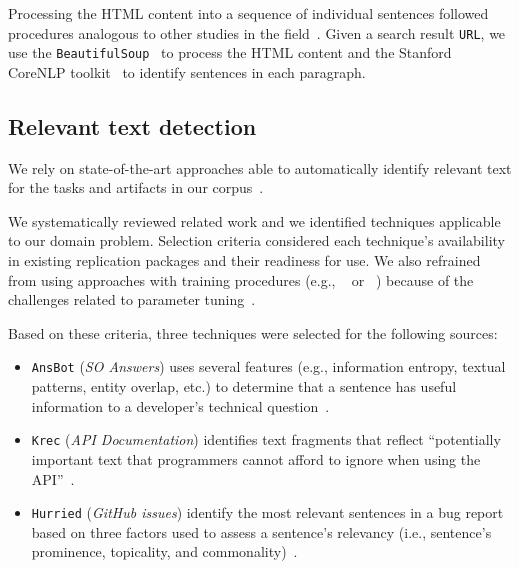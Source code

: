 Processing the HTML content into a sequence of individual sentences 
followed procedures analogous to other studies in the field~\cite{Arya2019, nadi2020}.
Given a search result \texttt{URL}, we use the \texttt{BeautifulSoup}~\cite{beautifulsoup4}
to process the HTML content and the Stanford CoreNLP toolkit~\cite{CoreNLP} to identify sentences in each paragraph.












\subsection{Relevant text detection}
\label{cp4:corpus-relevant-text}




 
We rely on state-of-the-art approaches able to automatically identify relevant text for the tasks and artifacts in our corpus~\cite{nadi2020, Robillard2015, Lotufo2012, Xu2017}.


We systematically reviewed related work and we identified techniques applicable to our domain problem. Selection criteria considered each technique's availability in existing replication packages and their readiness for use.
We also refrained from using approaches with training procedures (e.g., ~\cite{liu2020} or ~\cite{Treude2016}) because of the challenges related to parameter tuning~\cite{Chaparro2017, fucci2019}.



Based on these criteria, three techniques were selected for the following sources:


\begin{itemize}[leftmargin=\parindent, font=\normalfont\itshape]
    \item \texttt{\acs{AnsBot}} (\textit{SO Answers}) uses several features (e.g., information entropy, textual patterns, entity overlap, etc.) to determine that a sentence has useful information to a developer's technical question~\cite{Xu2017}.
    
    \item \texttt{\acs{Krec}} (\textit{API Documentation}) identifies text fragments that reflect ``potentially important text that programmers cannot afford to ignore when using the API''~\cite{Robillard2015}.
    
    \item \texttt{\acs{Hurried}} (\textit{GitHub issues}) identify the most relevant sentences in a bug report based on three factors used to assess a sentence's relevancy (i.e., sentence's prominence, topicality, and commonality)~\cite{Lotufo2012}.
\end{itemize}



